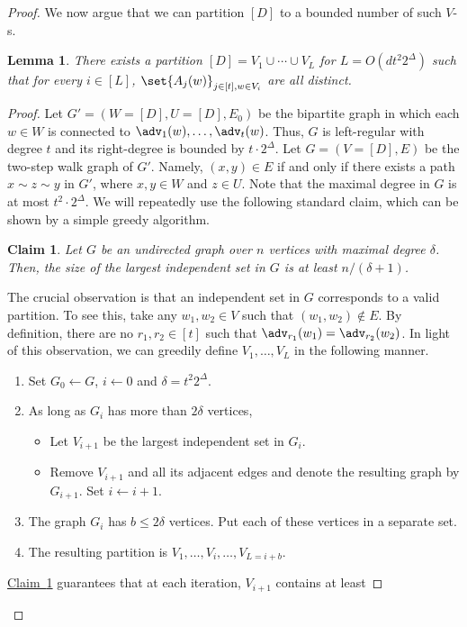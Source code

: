 \documentclass[11pt]{article}
\numberwithin{equation}{section}
\newtheorem{lemma}[theorem]{Lemma}
\newtheorem{claim}[theorem]{Claim}
\theoremstyle{definition}
\theoremstyle{plain}
\newcommand{\expref}[2]{\hyperref[#2]{#1~\ref{#2}}}
\begin{document}
\begin{proof}
We now argue that we can partition $[D]$ to a bounded number of such $V$-s.
\begin{lemma}
There exists a partition $[D] = V_1 \cup \cdots \cup V_L$ for $L = O(dt^2  2^{\Delta})$
such that for every $i \in [L]$, $\set{A_{j}(w)}_{j \in [t],w \in V_i}$ are all distinct.
\end{lemma}
\begin{proof}
Let $G' = (W = [D],U = [D],E_0)$ be the bipartite graph in which each $w \in W$ is
connected to $\adv_{1}(w),\ldots,\adv_{t}(w)$. Thus, $G$ is left-regular with degree $t$
and its right-degree is bounded by $t \cdot 2^{\Delta}$. Let $G = (V = [D],E)$ be the
two-step walk graph of $G'$. Namely, $(x,y) \in E$ if and only if there exists a path
$x \sim z \sim y$ in $G'$, where $x,y \in W$ and $z \in U$. 
Note that the maximal degree in $G$ is at most $t^{2} \cdot 2^{\Delta}$.
We will repeatedly use
the following standard claim, which can be shown by a simple greedy algorithm.
\begin{claim}\label{claim:aux}
Let $G$ be an undirected graph over $n$ vertices with maximal degree $\delta$.
Then, the size of the largest independent set in $G$ is at least 
%
%
$n/(\delta+1)$.
%
%
%
\end{claim}
The crucial observation is that an independent set in $G$ corresponds to a valid partition.
To see this, take any $w_1,w_2 \in V$ such that $(w_1,w_2) \notin E$. By definition, there are no
$r_1,r_2 \in [t]$ such that $\adv_{r_1}(w_1) = \adv_{r_2}(w_2)$. In light of this observation,
we can greedily define $V_1,\ldots,V_{L}$ in the following manner.
\begin{enumerate}
\item	Set $G_0 \leftarrow G$, $i \leftarrow 0$ and $\delta = t^{2}2^{\Delta}$.
\item	As long as $G_i$ has more than $2\delta$ vertices,
\begin{itemize}
\item	Let $V_{i+1}$ be the largest independent set in $G_{i}$.
\item	Remove $V_{i+1}$ and all its adjacent edges and denote the resulting graph by $G_{i+1}$.
Set $i \leftarrow i+1$.
\end{itemize} 
\item	The graph $G_i$ has $b \le 2\delta$ vertices. Put each of these vertices in a separate
set.
\item	The resulting partition is $V_{1},\ldots,V_{i},\ldots,V_{L = i+b}$.
\end{enumerate}
\expref{Claim}{claim:aux} guarantees that at each iteration, $V_{i+1}$ contains at least 

\end{proof}
\end{proof}
\end{document}
